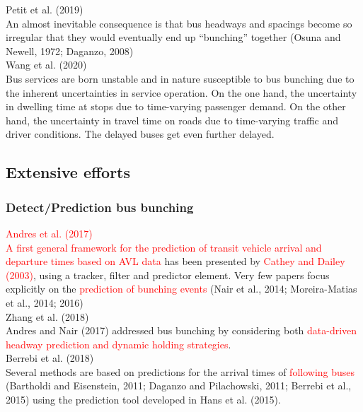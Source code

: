 \documentclass{article}
\begin{document}
\noindent \textrm{Petit et al. (2019)}\\
An almost inevitable consequence is that bus headways and spacings become so irregular
that they would eventually end up “bunching” together 
\textrm{(Osuna and Newell, 1972; Daganzo, 2008)}\\

\noindent \textrm{Wang et al. (2020)}\\
Bus services are born unstable and in nature susceptible to bus bunching 
due to the inherent uncertainties in service operation. 
On the one hand, the uncertainty in dwelling time at stops due to time-varying passenger demand.
On the other hand, the uncertainty in travel time on roads due to time-varying traffic and driver conditions.
The delayed buses get even further delayed.\\


\subsection*{Extensive efforts}
\subsubsection*{Detect/Prediction bus bunching}
\noindent \textrm{\textcolor{red}{Andres et al. (2017)}}\\
\textcolor{red}{A first general framework for the prediction of transit vehicle arrival and departure times based on AVL data }
has been presented by \textrm{\textcolor{red}{Cathey and Dailey (2003)}}, 
using a tracker, filter and predictor element.
Very few papers focus explicitly on the \textcolor{red}{prediction of bunching events} 
\textrm{(Nair et al., 2014; Moreira-Matias et al., 2014; 2016)}\\

\noindent \textrm{Zhang et al. (2018)}\\
\textrm{Andres and Nair (2017)} addressed bus bunching 
by considering both \textcolor{red}{data-driven headway prediction 
and dynamic holding strategies}.\\

\noindent \textrm{Berrebi et al. (2018)}\\
Several methods are based on predictions for the arrival times of \textcolor{red}{following buses}\marginpar[]{\textcolor{red}{why predict following buses?}} 
\textrm{(Bartholdi and Eisenstein, 2011; Daganzo and Pilachowski, 2011; Berrebi et al., 2015)}
using the prediction tool developed in \textrm{Hans et al. (2015)}.\\
\end{document}
